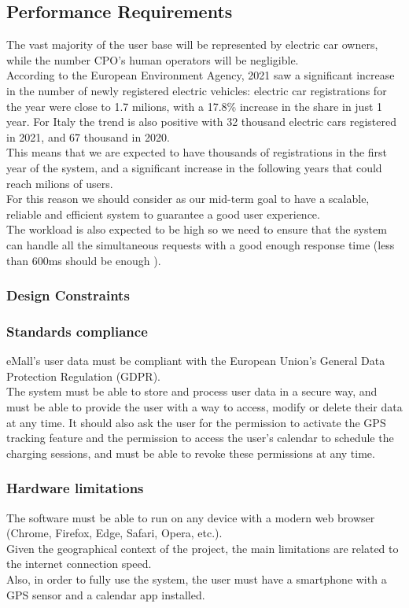 \documentclass[table, 12pt]{article} %
\begin{document}
    \subsection{Performance Requirements}
    The vast majority of the user base will be represented by electric car owners, while the number CPO's human operators will be negligible.\\
    According to the European Environment Agency, 2021 saw a significant increase in the number of newly registered electric vehicles:
    electric car registrations for the year were close to 1.7 milions, with a 17.8\% increase in the share in just 1 year.
    For Italy the trend is also positive with 32 thousand electric cars registered in 2021, and 67 thousand in 2020.\\
    This means that we are expected to have thousands of registrations in the first year of the system, and a significant increase in the following years that could reach milions of users.\\
    For this reason we should consider as our mid-term goal to have a scalable, reliable and efficient system to guarantee a good user experience.\\
    The workload is also expected to be high so we need to ensure that the system can handle all the simultaneous requests with a good enough response time (less than 600ms should be enough ).

    \subsubsection{Design Constraints}
    \subsubsection{Standards compliance}
    eMall's user data must be compliant with the European Union's General Data Protection Regulation (GDPR). \\
    The system must be able to store and process user data in a secure way, and must be able to provide the user with a way to access, modify or delete their data at any time.
    It should also ask the user for the permission to activate the GPS tracking feature and the permission to access the user's calendar to schedule the charging sessions, and must be able to revoke these permissions at any time.
    
    \subsubsection{Hardware limitations}
    The software must be able to run on any device with a modern web browser (Chrome, Firefox, Edge, Safari, Opera, etc.).\\
    Given the geographical context of the project, the main limitations are related to the internet connection speed.\\
    Also, in order to fully use the system, the user must have a smartphone with a GPS sensor and a calendar app installed.
\end{document}

